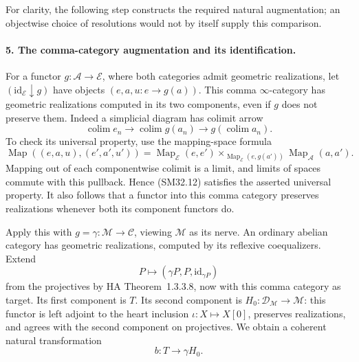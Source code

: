 For clarity, the following step constructs the required natural
augmentation; an objectwise choice of resolutions would not
by itself supply this comparison.

\paragraph{5. The comma-category augmentation and its identification.}
For a functor \(g:\mathcal A\to\mathcal E\), where both
categories admit geometric realizations, let
\((\mathrm{id}_{\mathcal E}\downarrow g)\) have objects
\((e,a,u:e\to g(a))\).  This comma \(\infty\)-category has
geometric realizations computed in its two components, even
if \(g\) does not preserve them.  Indeed a simplicial diagram
has colimit arrow
\[
 \operatorname*{colim}e_n\longrightarrow
 \operatorname*{colim}g(a_n)\longrightarrow
                                g(\operatorname*{colim}a_n).
                                                               \tag{SM32.12}
\]
To check its universal property, use the mapping-space formula
\[
 \operatorname{Map}((e,a,u),(e',a',u'))
 =\operatorname{Map}_{\mathcal E}(e,e')
  \mathop{\times}_{\operatorname{Map}_{\mathcal E}(e,g(a'))}
                 \operatorname{Map}_{\mathcal A}(a,a').        \tag{SM32.13}
\]
Mapping out of each componentwise colimit is a limit, and
limits of spaces commute with this pullback.  Hence (SM32.12)
satisfies the asserted universal property.  It also follows
that a functor into this comma category preserves realizations
whenever both its component functors do.

Apply this with \(g=\gamma:\mathcal M\to\mathcal C\),
viewing \(\mathcal M\) as its nerve.  An ordinary abelian
category has geometric realizations, computed by its reflexive
coequalizers.  Extend
\[
       P\longmapsto(\gamma P,P,\mathrm{id}_{\gamma P})
                                                               \tag{SM32.14}
\]
from the projectives by HA Theorem~1.3.3.8, now with this
comma category as target.  Its first component is \(T\).
Its second component is \(H_0:\mathcal D_{\mathcal M}
\to\mathcal M\): this functor is left adjoint to the heart
inclusion \(\iota:X\mapsto X[0]\), preserves realizations,
and agrees with the second component on projectives.
We obtain a coherent natural transformation
\[
                             b:T\longrightarrow\gamma H_0.  \tag{SM32.15}
\]


